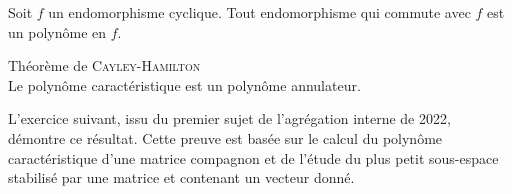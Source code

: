 \begin{prop}
    Soit $f$ un endomorphisme cyclique. Tout endomorphisme qui commute avec $f$ est un polynôme en $f$.
\end{prop}

\begin{preuve}
    
\end{preuve}

\begin{theo}
    Théorème de \textsc{Cayley}-\textsc{Hamilton} \\
    Le polynôme caractéristique est un polynôme annulateur.
\end{theo}

L'exercice suivant, issu du premier sujet de l'agrégation interne de 2022, démontre ce résultat. Cette preuve est basée sur le calcul du polynôme caractéristique d'une matrice compagnon et de l'étude du plus petit sous-espace stabilisé par une matrice et contenant un vecteur donné. \\



